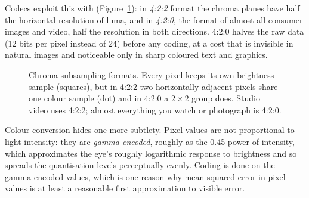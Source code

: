 Codecs exploit this with  (Figure~\ref{fig:ch16_chroma_formats}): in
\emph{4:2:2} format the chroma planes have half the horizontal resolution of luma, and in
\emph{4:2:0}, the format of almost all consumer images and video, half the resolution in both
directions. 4:2:0 halves the raw data (12 bits per pixel instead of 24) before any coding, at a
cost that is invisible in natural images and noticeable only in sharp coloured text and graphics.

\begin{figure}[htbp]\centering
{}
\caption{Chroma subsampling formats. Every pixel keeps its own brightness sample (squares), but in
4:2:2 two horizontally adjacent pixels share one colour sample (dot) and in 4:2:0 a $2\times2$ group
does. Studio video uses 4:2:2; almost everything you watch or photograph is 4:2:0.}
\label{fig:ch16_chroma_formats}
\end{figure}

Colour conversion hides one more subtlety. Pixel values are not proportional to light intensity: they
are \emph{gamma-encoded}, roughly as the 0.45 power of intensity, which approximates the eye's roughly
logarithmic response to brightness and so spreads the quantisation levels perceptually evenly. Coding
is done on the gamma-encoded values, which is one reason why mean-squared error in pixel values is at
least a reasonable first approximation to visible error.

